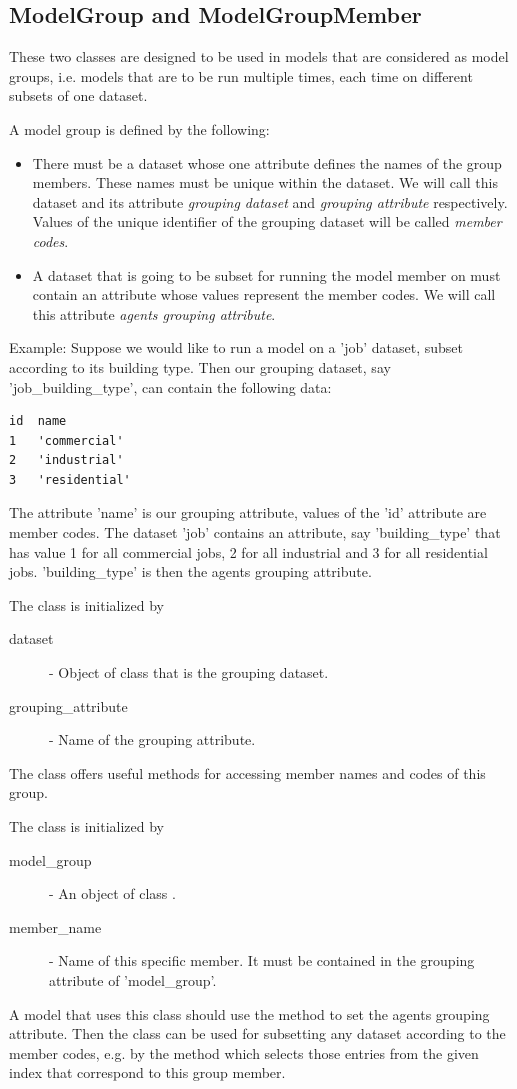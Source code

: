 {\subsection{ModelGroup and ModelGroupMember}
%
\label{sec:model-group}
%
These two classes are designed to be used in models that are considered as model groups, i.e. models that are to be run
multiple times, each time on different subsets of one dataset.

A model group is defined by the following:
\begin{itemize}
\item There must be a dataset whose one attribute defines the names of the group members.
These names must be unique within the dataset.
We will call this dataset and its attribute {\em grouping dataset} and {\em grouping attribute} respectively.
Values of the unique identifier of the grouping dataset will be called  {\em member codes}.
\item A dataset that is going to be subset for running the model member on must contain an attribute whose values
represent the member codes. We will call this attribute {\em agents grouping attribute}.
\end{itemize}

Example: Suppose we would like to run a model on a 'job' dataset, subset according to its building type. Then
our grouping dataset, say 'job_building_type', can contain the following data:
\begin{verbatim}
id	name
1	'commercial'
2	'industrial'
3	'residential'
\end{verbatim}
The attribute 'name' is our grouping attribute, values of the 'id' attribute are member codes.
The dataset 'job' contains an attribute, say 'building_type' that has
value 1 for all commercial jobs, 2 for all industrial and 3 for all residential jobs. 'building_type' is then the
agents grouping attribute.

The class  is initialized by
\begin{description}
\item[dataset] - Object of class  that is the grouping dataset.
\item[grouping_attribute] - Name of the grouping attribute.
\end{description}
The class offers useful methods for accessing member names and codes of this group.

The class  is initialized by
\begin{description}
\item[model_group] - An object of class .
\item[member_name] - Name of this specific member. It must be contained in the grouping attribute of 'model_group'.
\end{description}
A model that uses this class should use the method  to set
the agents grouping attribute. Then the class can be used for subsetting any dataset according to the member codes,
e.g. by the method  which selects those entries from the given index that
correspond to this group member.

}
